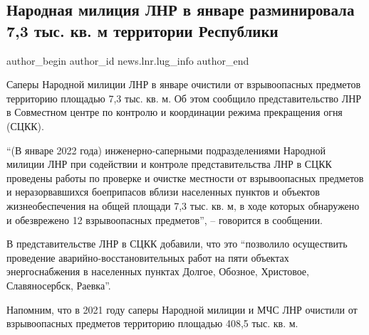  
 
 
 
 
 
\subsection{Народная милиция ЛНР в январе разминировала 7,3 тыс. кв. м территории Республики}
\label{sec:01_02_2022.stz.news.lnr.lug_info.1.nm_lnr_razminirovanie}
 
\ifcmt
 author_begin
   author_id news.lnr.lug_info
 author_end
\fi

Саперы Народной милиции ЛНР в январе очистили от взрывоопасных предметов
территорию площадью 7,3 тыс. кв. м. Об этом сообщило представительство ЛНР в
Совместном центре по контролю и координации режима прекращения огня (СЦКК).


\enquote{(В январе 2022 года) инженерно-саперными подразделениями Народной милиции ЛНР
при содействии и контроле представительства ЛНР в СЦКК проведены работы по
проверке и очистке местности от взрывоопасных предметов и неразорвавшихся
боеприпасов вблизи населенных пунктов и объектов жизнеобеспечения на общей
площади 7,3 тыс. кв. м, в ходе которых обнаружено и обезврежено 12
взрывоопасных предметов}, – говорится в сообщении.

В представительстве ЛНР в СЦКК добавили, что это \enquote{позволило осуществить
проведение аварийно-восстановительных работ на пяти объектах энергоснабжения в
населенных пунктах Долгое, Обозное, Христовое, Славяносербск, Раевка}.

Напомним, что в 2021 году саперы Народной милиции и МЧС ЛНР очистили от
взрывоопасных предметов территорию площадью 408,5 тыс. кв. м.
